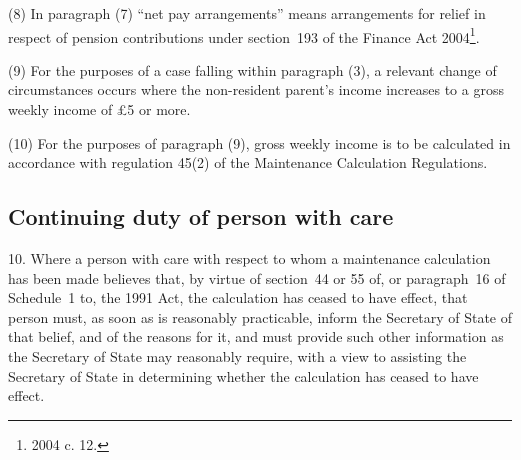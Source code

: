 \documentclass[12pt,a4paper]{article}
\begin{document}
(8) In paragraph (7) “net pay arrangements” means arrangements for relief in respect of pension contributions under section~193 of the Finance Act 2004\footnote{2004 c. 12.}.

(9) For the purposes of a case falling within paragraph (3), a relevant change of circumstances occurs where the non-resident parent’s income increases to a gross weekly income of 
£5 
or more.

(10) For the purposes of paragraph (9), gross weekly income is to be calculated in accordance with regulation 45(2) of the Maintenance Calculation Regulations.


\subsection[10. Continuing duty of person with care]{Continuing duty of person with care}

10.  Where a person with care with respect to whom a maintenance calculation has been made believes that, by virtue of section~44 or 55 of, or paragraph~16 of Schedule~1 to, the 1991 Act, the calculation has ceased to have effect, that person must, as soon as is reasonably practicable, inform the 
Secretary of State  %
of that belief, and of the reasons for it, and must provide such other information as the 
Secretary of State  %
may reasonably require, with a view to assisting the 
Secretary of State  %
in determining whether the calculation has ceased to have effect.

\end{document}
